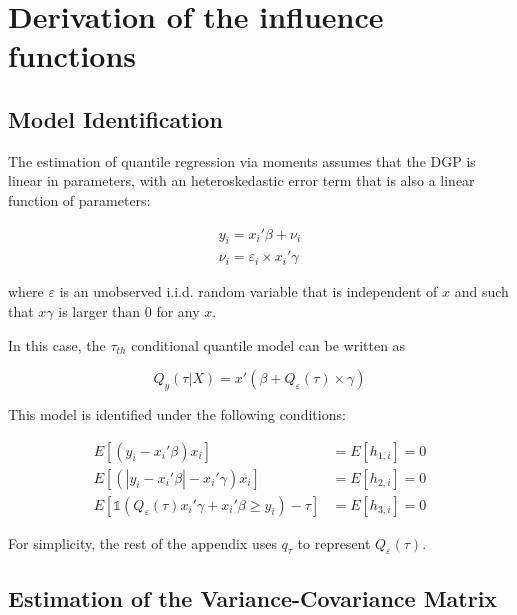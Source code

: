 \documentclass[
  authoryear,
  review,
  1p]{elsarticle}
\begin{document}
\renewcommand{\bibsection}{}


\newpage{}

\appendix

\section{Derivation of the influence
functions}\label{derivation-of-the-influence-functions}

\subsection{Model Identification}\label{model-identification}

The estimation of quantile regression via moments assumes that the DGP
is linear in parameters, with an heteroskedastic error term that is also
a linear function of parameters:

\[\begin{aligned}
y_i = x_i'\beta + \nu_i \\
\nu_i = \varepsilon_i \times x_i'\gamma
\end{aligned}
\]

where \(\varepsilon\) is an unobserved i.i.d. random variable that is
independent of \(x\) and such that \(x\gamma\) is larger than 0 for any
\(x\).

In this case, the \(\tau_{th}\) conditional quantile model can be
written as

\[Q_y(\tau|X) = x'(\beta +Q_\varepsilon(\tau)  \times \gamma)\]

This model is identified under the following conditions:

\[\begin{aligned}
  E[(y_i-x_i'\beta)x_i ]  &= E[h_{1,i}]=0 \\
  E[ (|y_i-x_i'\beta|-x_i' \gamma) x_i ] &=E[h_{2,i}]=0 \\
  E\left[  \mathbb{1}\left( Q_\varepsilon(\tau) x_i'\gamma +x_i'\beta\geq  y_i  \right) - \tau \right] 
   &=E[h_{3,i}]=0 
\end{aligned}
\]

For simplicity, the rest of the appendix uses \(q_\tau\) to represent
\(Q_\varepsilon(\tau)\).

\subsection{Estimation of the Variance-Covariance
Matrix}\label{estimation-of-the-variance-covariance-matrix}
\end{document}
